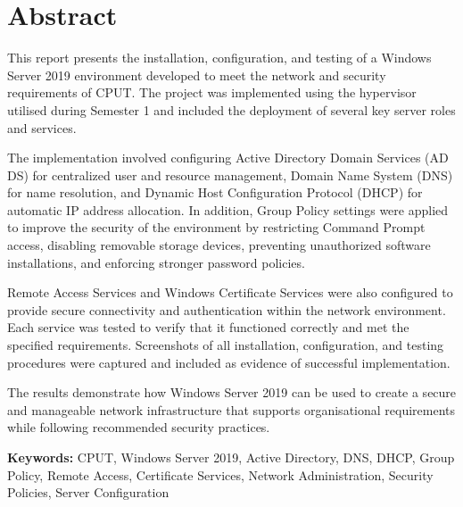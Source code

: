 \chapter*{Abstract}

This report presents the installation, configuration, and testing of a Windows Server 2019 environment developed to meet the network and security requirements of CPUT. The project was implemented using the hypervisor utilised during Semester 1 and included the deployment of several key server roles and services.
\vspace{5mm}

The implementation involved configuring Active Directory Domain Services (AD DS) for centralized user and resource management, Domain Name System (DNS) for name resolution, and Dynamic Host Configuration Protocol (DHCP) for automatic IP address allocation. In addition, Group Policy settings were applied to improve the security of the environment by restricting Command Prompt access, disabling removable storage devices, preventing unauthorized software installations, and enforcing stronger password policies.
\vspace{5mm}

Remote Access Services and Windows Certificate Services were also configured to provide secure connectivity and authentication within the network environment. Each service was tested to verify that it functioned correctly and met the specified requirements. Screenshots of all installation, configuration, and testing procedures were captured and included as evidence of successful implementation.
\vspace{5mm}

The results demonstrate how Windows Server 2019 can be used to create a secure and manageable network infrastructure that supports organisational requirements while following recommended security practices.

\vspace{5mm}
\textbf{Keywords:} CPUT, Windows Server 2019, Active Directory, DNS, DHCP, Group Policy, Remote Access, Certificate Services, Network Administration, Security Policies, Server Configuration


